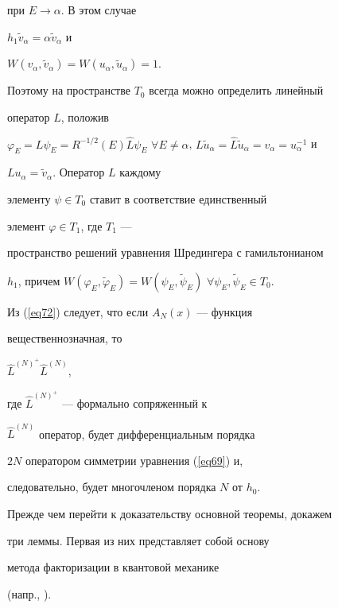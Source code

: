 при $E\rightarrow \alpha$. В этом случае


$h_1\widetilde{v}_\alpha =\alpha \widetilde{v}_\alpha$ и


$W(v_\alpha ,\widetilde{v}_\alpha )=W(u_\alpha


,\widetilde{u}_\alpha )=1$.


Поэтому на пространстве $T_0$ всегда можно определить линейный


оператор $L$, положив


$\varphi _E=L\psi _E=R^{-1/2}(E)\widehat{L}\psi _E$ $\forall


E\neq \alpha$, $L\widetilde{u}_\alpha


=\widehat{L}\widetilde{u}_\alpha =v_\alpha =u_\alpha ^{-1}$ и


$Lu_\alpha =\widetilde{v}_\alpha $. Оператор $L$ каждому


элементу $\psi \in T_0$ ставит в соответствие единственный


элемент $\varphi \in T_1$, где $T_1$ ---


пространство решений уравнения Шредингера с гамильтонианом


$h_1$, причем $W(\varphi _E,\widetilde \varphi _E)=W(\psi_E,


\widetilde \psi _E)$ $\forall \psi _E,\widetilde \psi _E\in T_0$.





Из (\ref{eq72}) следует, что если $A_{N} (x)$ --- функция


вещественнозначная, то


$\widehat{L}^{(N)^{+}}\widehat{L}^{(N)}$,


где $\widehat{L}^{(N)^{+}}$ --- формально сопряженный к


$\widehat{L}^{(N)}$ оператор, будет дифференциальным порядка


$2N$ оператором симметрии уравнения (\ref{eq69}) и,


следовательно, будет многочленом порядка $N$ от $h_{0}$.





Прежде чем перейти к доказательству основной теоремы, докажем


три леммы. Первая из них представляет собой основу


метода факторизации в квантовой механике


(напр., \cite{xi}).





